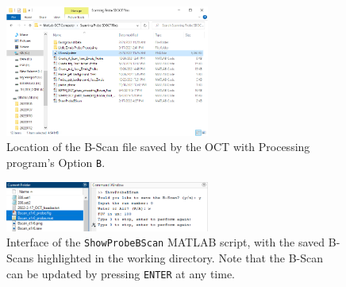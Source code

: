 \documentclass{article}
\begin{document}
\begin{figure}[!h]\label{Bloc}
	\centering
	\includegraphics[width=0.6\textwidth]{Data for Probe Writeup/BScan location.png}
	\caption{Location of the B-Scan file saved by the OCT with Processing program's Option \texttt{B}.}
\end{figure}

\begin{figure}[!h]\label{showprobebscan}
	\centering
	\includegraphics[width=0.6\textwidth]{Data for Probe Writeup/ShowProbeBScan operation.png}
	\caption{Interface of the \texttt{ShowProbeBScan} MATLAB script, with the saved B-Scans highlighted in the working directory. Note that the B-Scan can be updated by pressing \texttt{ENTER} at any time.}
\end{figure}
\end{document}
